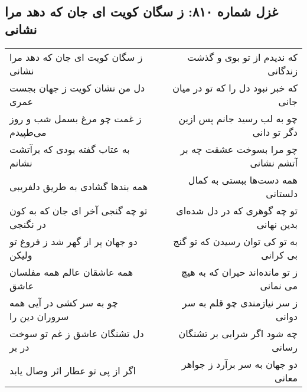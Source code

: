\begin{center}
\section*{غزل شماره ۸۱۰: ز سگان کویت ای جان که دهد مرا نشانی}
\label{sec:810}
\begin{longtable}{l p{0.5cm} r}
ز سگان کویت ای جان که دهد مرا نشانی
&&
که ندیدم از تو بوی و گذشت زندگانی
\\
دل من نشان کویت ز جهان بجست عمری
&&
که خبر نبود دل را که تو در میان جانی
\\
ز غمت چو مرغ بسمل شب و روز می‌طپیدم
&&
چو به لب رسید جانم پس ازین دگر تو دانی
\\
به عتاب گفته بودی که برآتشت نشانم
&&
چو مرا بسوخت عشقت چه بر آتشم نشانی
\\
همه بندها گشادی به طریق دلفریبی
&&
همه دست‌ها ببستی به کمال دلستانی
\\
تو چه گنجی آخر ای جان که به کون در نگنجی
&&
تو چه گوهری که در دل شده‌ای بدین نهانی
\\
دو جهان پر از گهر شد ز فروغ تو ولیکن
&&
به تو کی توان رسیدن که تو گنج بی کرانی
\\
همه عاشقان عالم همه مفلسان عاشق
&&
ز تو مانده‌اند حیران که به هیچ می نمانی
\\
چو به سر کشی در آیی همه سروران دین را
&&
ز سر نیازمندی چو قلم به سر دوانی
\\
دل تشنگان عاشق ز غم تو سوخت در بر
&&
چه شود اگر شرابی بر تشنگان رسانی
\\
اگر از پی تو عطار اثر وصال یابد
&&
دو جهان به سر برآرد ز جواهر معانی
\\
\end{longtable}
\end{center}
